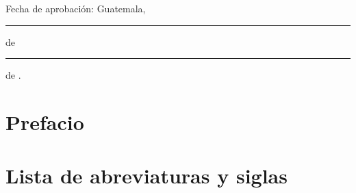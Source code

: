 \documentclass[11pt, letterpaper, twoside, openright]{report}
\newcommand{\defaultparformat}[1]{
	{\setlength{\parskip}{2ex}
     }
}
\begin{document}
	Fecha de aprobación: Guatemala, \rule[1pt]{0.5 in}{1pt} de \rule[1pt]{1 in}{1pt} de \anoaprobacion.
	\normalsize
\fi

\pagestyle{plain}
\ifdefined\CAPprefacio
	\newpage
	\cleardoublepage{}
    \chapter*{Prefacio}
    \ifdefined\parpordefecto
    	\defaultparformat{a-prefacio}
    \else
    	
    \fi
\fi

\ifdefined\CAPindice
	\newpage
    \cleardoublepage{}
	\renewcommand{\contentsname}{Índice}
    \pdfbookmark{\contentsname}{toc}
	\tableofcontents
\fi

\ifdefined\CAPfiguras
	\newpage
    \cleardoublepage{}
	\renewcommand{\listfigurename}{Lista de figuras}
	\listoffigures
\fi

\ifdefined\CAPcuadros
	\newpage
    \cleardoublepage{}
	\renewcommand{\listtablename}{Lista de cuadros}
	\listoftables
\fi

\ifdefined\CAPabreviaturas
	\newpage
	\cleardoublepage{}
	\chapter*{Lista de abreviaturas y siglas}
	
\fi

\ifdefined\CAPresumen
	\newpage
    \cleardoublepage{}
\end{document}
